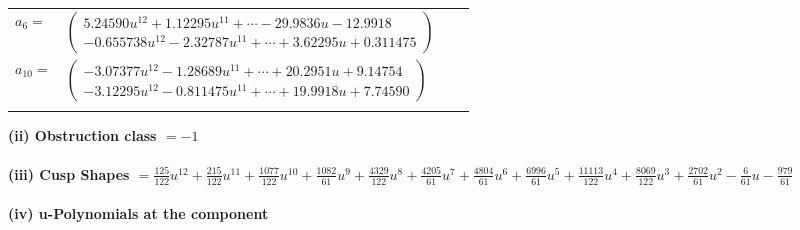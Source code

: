 \documentclass[1p]{elsarticle_modified}
\theoremstyle{definition}
\begin{document}
\begin{tabular}{m{7pt} m{180pt} m{7pt} m{180pt} }
\flushright $a_{6}=$&$\begin{pmatrix}5.24590 u^{12}+1.12295 u^{11}+\cdots-29.9836 u-12.9918\\-0.655738 u^{12}-2.32787 u^{11}+\cdots+3.62295 u+0.311475\end{pmatrix}$ \\
\flushright $a_{10}=$&$\begin{pmatrix}-3.07377 u^{12}-1.28689 u^{11}+\cdots+20.2951 u+9.14754\\-3.12295 u^{12}-0.811475 u^{11}+\cdots+19.9918 u+7.74590\end{pmatrix}$\\&\end{tabular}
\flushleft \textbf{(ii) Obstruction class $= -1$}\\~\\
\flushleft \textbf{(iii) Cusp Shapes $= \frac{125}{122} u^{12}+\frac{215}{122} u^{11}+\frac{1077}{122} u^{10}+\frac{1082}{61} u^9+\frac{4329}{122} u^8+\frac{4205}{61} u^7+\frac{4804}{61} u^6+\frac{6996}{61} u^5+\frac{11113}{122} u^4+\frac{8069}{122} u^3+\frac{2702}{61} u^2-\frac{6}{61} u-\frac{979}{61}$}\\~\\
\newpage\renewcommand{\arraystretch}{1}
\flushleft \textbf{(iv) u-Polynomials at the component}\newline \\
\end{document}
